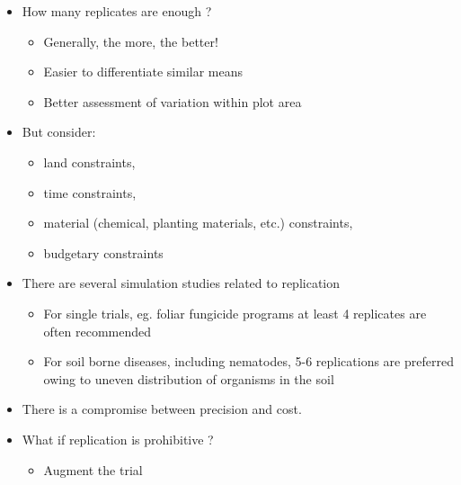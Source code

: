 \documentclass[
  ignorenonframetext,
  aspectratio=169]{beamer}
\providecommand{\tightlist}{%
  \setlength{\itemsep}{0pt}\setlength{\parskip}{0pt}}
\begin{document}
\begin{frame}{}
\protect\hypertarget{section-3}{}
\begin{itemize}[<+->]
\tightlist
\item
  How many replicates are enough ?

  \begin{itemize}[<+->]
  \tightlist
  \item
    Generally, the more, the better!
  \item
    Easier to differentiate similar means
  \item
    Better assessment of variation within plot area
  \end{itemize}
\item
  But consider:

  \begin{itemize}[<+->]
  \tightlist
  \item
    land constraints,
  \item
    time constraints,
  \item
    material (chemical, planting materials, etc.) constraints,
  \item
    budgetary constraints
  \end{itemize}
\item
  There are several simulation studies related to replication

  \begin{itemize}[<+->]
  \tightlist
  \item
    For single trials, eg. foliar fungicide programs at least 4
    replicates are often recommended
  \item
    For soil borne diseases, including nematodes, 5-6 replications are
    preferred owing to uneven distribution of organisms in the soil
  \end{itemize}
\item
  There is a compromise between precision and cost.
\item
  What if replication is prohibitive ?

  \begin{itemize}[<+->]
  \tightlist
  \item
    Augment the trial
  \end{itemize}
\end{itemize}
\end{frame}
\end{document}
